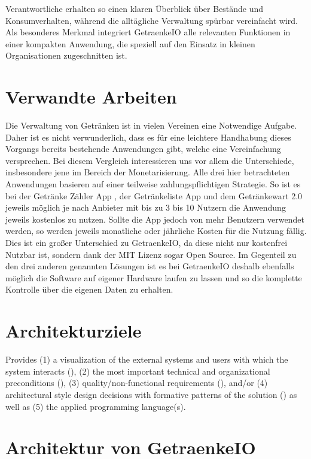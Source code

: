 \documentclass[conference,a4paper]{cs-techrep}
\begin{document}
Verantwortliche erhalten so einen klaren Überblick über Bestände und Konsumverhalten, während die alltägliche Verwaltung spürbar vereinfacht wird. Als besonderes Merkmal integriert GetraenkeIO alle relevanten Funktionen in einer kompakten Anwendung, die speziell auf den Einsatz in kleinen Organisationen zugeschnitten ist.

\section{Verwandte Arbeiten}
Die Verwaltung von Getränken ist in vielen Vereinen eine Notwendige Aufgabe. Daher ist es nicht verwunderlich, dass es für eine leichtere Handhabung dieses Vorgangs bereits bestehende Anwendungen gibt, welche eine Vereinfachung versprechen. Bei diesem Vergleich interessieren uns vor allem die Unterschiede, insbesondere jene im Bereich der Monetarisierung.
Alle drei hier betrachteten Anwendungen basieren auf einer teilweise zahlungspflichtigen Strategie. So ist es bei der Getränke Zähler App \cite{drinkscounter}, der Getränkeliste App \cite{getraenkelisteapp} und dem Getränkewart 2.0 \cite{getraenkewart} jeweils möglich je nach Anbieter mit bis zu 3 bis 10 Nutzern die Anwendung jeweils kostenlos zu nutzen. Sollte die App jedoch von mehr Benutzern verwendet werden, so werden jeweils monatliche oder jährliche Kosten für die Nutzung fällig. Dies ist ein großer Unterschied zu GetraenkeIO, da diese nicht nur kostenfrei Nutzbar ist, sondern dank der MIT Lizenz sogar Open Source. Im Gegenteil zu den drei anderen genannten Lösungen ist es bei GetraenkeIO deshalb ebenfalls möglich die Software auf eigener Hardware laufen zu lassen und so die komplette Kontrolle über die eigenen Daten zu erhalten.

\section{Architekturziele} %
Provides
(1) a visualization of the external systems and users with which the system interacts (),
(2) the most important technical and organizational preconditions (),
(3) quality/non-functional requirements (), and/or
(4) architectural style design decisions with formative patterns of the solution ()
as well as (5) the applied programming language(s).

\section{Architektur von GetraenkeIO} %
\end{document}

